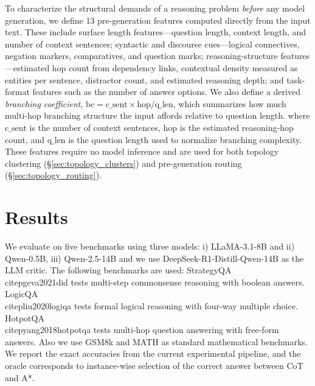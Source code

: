 \documentclass{article}
\begin{document}
To characterize the structural demands of a reasoning problem \emph{before} any model generation, we define 13 pre-generation features computed directly from the input text. These include surface length features---question length, context length, and number of context sentences; syntactic and discourse cues---logical connectives, negation markers, comparatives, and question marks; reasoning-structure features---estimated hop count from dependency links, contextual density measured as entities per sentence, distractor count, and estimated reasoning depth; and task-format features such as the number of answer options. We also define a derived \emph{branching coefficient}, $\mathrm{bc}=\mathrm{c\_sent}\times \mathrm{hop}/\mathrm{q\_len}$, which summarizes how much multi-hop branching structure the input affords relative to question length. 
where $\mathrm{c\_sent}$ is the number of context sentences, $\mathrm{hop}$ is the estimated reasoning-hop count, and $\mathrm{q\_len}$ is the question length used to normalize branching complexity.
These features require no model inference and are used for both topology clustering (\S\ref{sec:topology_clusters}) and pre-generation routing (\S\ref{sec:topology_routing}).




\section{Results}
\label{sec:results}

We evaluate on five benchmarks using three models: i) LLaMA-3.1-8B and ii) Qwen-0.5B, iii) Qwen-2.5-14B and we use DeepSeek-R1-Distill-Qwen-14B as the LLM critic. The following benchmarks are used: StrategyQA~\\citep{geva2021did} tests multi-step commonsense reasoning with boolean answers. LogicQA~\\citep{liu2020logiqa} tests formal logical reasoning with four-way multiple choice. HotpotQA~\\citep{yang2018hotpotqa} tests multi-hop question answering with free-form answers. Also we use GSM8k and MATH as standard mathematical benchmarks. We report the exact accuracies from the current experimental pipeline, and the oracle corresponds to instance-wise selection of the correct answer between CoT and A*.

\end{document}
